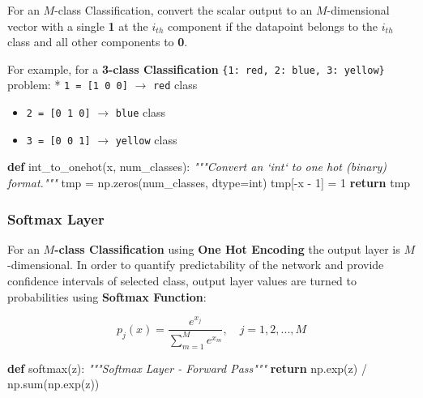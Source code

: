 \documentclass[11pt]{article}
\newenvironment{Shaded}{}{}
\newcommand{\KeywordTok}[1]{\textcolor[rgb]{0.00,0.44,0.13}{\textbf{{#1}}}}
\newcommand{\DecValTok}[1]{\textcolor[rgb]{0.25,0.63,0.44}{{#1}}}
\newcommand{\CommentTok}[1]{\textcolor[rgb]{0.38,0.63,0.69}{\textit{{#1}}}}
\newcommand{\NormalTok}[1]{{#1}}
\newcommand{\ControlFlowTok}[1]{\textcolor[rgb]{0.00,0.44,0.13}{\textbf{{#1}}}}
\newcommand{\OperatorTok}[1]{\textcolor[rgb]{0.40,0.40,0.40}{{#1}}}
\newcommand{\BuiltInTok}[1]{{#1}}
\begin{document}
    For an \(M\)-class Classification, convert the scalar output to an
\(M\)-dimensional vector with a single \textbf{1} at the \(i_{th}\)
component if the datapoint belongs to the \(i_{th}\) class and all other
components to \textbf{0}.

For example, for a \textbf{3-class Classification}
\texttt{\{1:\ red,\ 2:\ blue,\ 3:\ yellow\}} problem: *
\texttt{1\ =\ {[}1\ 0\ 0{]}} \(\rightarrow\) \texttt{red} class

\begin{itemize}
\item
  \texttt{2\ =\ {[}0\ 1\ 0{]}} \(\rightarrow\) \texttt{blue} class
\item
  \texttt{3\ =\ {[}0\ 0\ 1{]}} \(\rightarrow\) \texttt{yellow} class
\end{itemize}

    \begin{Shaded}
\begin{Highlighting}[]
\KeywordTok{def}\NormalTok{ int_to_onehot(x, num_classes):}
    \CommentTok{"""Convert an `int` to one hot (binary) format."""}
\NormalTok{    tmp }\OperatorTok{=}\NormalTok{ np.zeros(num_classes, dtype}\OperatorTok{=}\BuiltInTok{int}\NormalTok{)}
\NormalTok{    tmp[}\OperatorTok{-}\NormalTok{x }\OperatorTok{-} \DecValTok{1}\NormalTok{] }\OperatorTok{=} \DecValTok{1}
    \ControlFlowTok{return}\NormalTok{ tmp}
\end{Highlighting}
\end{Shaded}

    \subsubsection{Softmax Layer }\label{softmax-layer}

    For an \textbf{\(M\)-class Classification} using \textbf{One Hot
Encoding} the output layer is \(M\)-dimensional. In order to quantify
predictability of the network and provide confidence intervals of
selected class, output layer values are turned to probabilities using
\textbf{Softmax Function}:

\[p_{j}(x) = \frac{e^{x_{j}}}{\sum_{m=1}^{M}e^{x_{m}}}, \quad j=1, 2, ..., M\]

    \begin{Shaded}
\begin{Highlighting}[]
\KeywordTok{def}\NormalTok{ softmax(z):}
    \CommentTok{"""Softmax Layer - Forward Pass"""}
    \ControlFlowTok{return}\NormalTok{ np.exp(z) }\OperatorTok{/}\NormalTok{ np.}\BuiltInTok{sum}\NormalTok{(np.exp(z))}
\end{Highlighting}
\end{Shaded}
\end{document}

